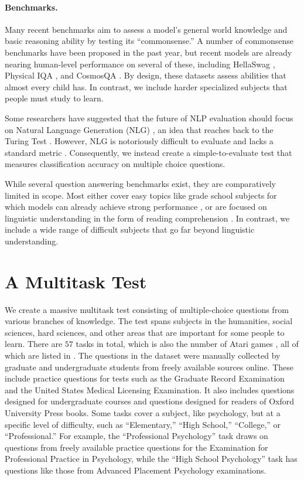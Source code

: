 \documentclass{article}
\begin{document}
\paragraph{Benchmarks.} 
Many recent benchmarks aim to assess a model's general world knowledge and basic reasoning ability by testing its ``commonsense.'' A number of commonsense benchmarks have been proposed in the past year, but recent models are already nearing human-level performance on several of these, including HellaSwag \citep{zellers2019hellaswag}, Physical IQA \citep{bisk2019physicaliqa}, and CosmosQA \citep{huang2019cosmosqa}. By design, these datasets assess abilities that almost every child has. In contrast, we include harder specialized subjects that people must study to learn. 

Some researchers have suggested that the future of NLP evaluation should focus on Natural Language Generation (NLG) \citep{zellers2020turingadvice}, an idea that reaches back to the Turing Test \citep{Turing1990TuringTest}. However, NLG is notoriously difficult to evaluate and lacks a standard metric \citep{Sai2020NLGSurvey}. Consequently, we instead create a simple-to-evaluate test that measures classification accuracy on multiple choice questions.

While several question answering benchmarks exist, they are comparatively limited in scope. Most either cover easy topics like grade school subjects for which models can already achieve strong performance \citep{Clark2018ARCAI2, khot2019qasc, OpenBookQA2018,Clark2019RegentsScienceExams}, or are focused on linguistic understanding in the form of reading comprehension \citep{lai2017race, richardson-etal-2013-mctest}. In contrast, we include a wide range of difficult subjects that go far beyond linguistic understanding.

\section{A Multitask Test}

We create a massive multitask test consisting of multiple-choice questions from various branches of knowledge.
The test spans subjects in the humanities, social sciences, hard sciences, and other areas that are important for some people to learn. 
There are $57$ tasks in total, 
which is also the number of Atari games \citep{Bellemare2013Atari}, 
all of which are listed in .
The questions in the dataset were manually collected by graduate and undergraduate students from freely available sources online. These include practice questions for tests such as the Graduate Record Examination and the United States Medical Licensing Examination. It also includes questions designed for undergraduate courses and questions designed for readers of Oxford University Press books. 
Some tasks cover a subject, like psychology, but at a specific level of difficulty, such as ``Elementary,'' ``High School,'' ``College,'' or ``Professional.''
For example, the ``Professional Psychology'' task draws on questions from freely available practice questions for the Examination for Professional Practice in Psychology, while the ``High School Psychology'' task has questions like those from Advanced Placement Psychology examinations.
\end{document}
